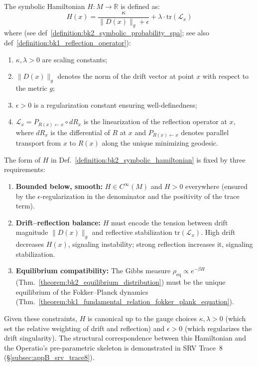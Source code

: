 \begin{definition} 
\label{definition:bk2_symbolic_hamiltonian} 
The symbolic Hamiltonian $H: M \rightarrow \mathbb{R}$ is defined as:
\[
H(x) = \frac{\kappa}{\|D(x)\|_g + \epsilon} + \lambda \cdot \text{tr}(\mathcal{L}_x)
\]
where (see def~\ref{definition:bk2_symbolic_probability_spa}; see also def~\ref{definition:bk1_reflection_operator}):
\begin{enumerate}
    \item $\kappa, \lambda > 0$ are scaling constants;
    \item $\|D(x)\|_g$ denotes the norm of the drift vector at point $x$ with respect to the metric $g$;
    \item $\epsilon > 0$ is a regularization constant ensuring well-definedness;
    \item $\mathcal{L}_x = P_{R(x) \leftarrow x} \circ dR_x$ is the linearization of the reflection operator at $x$, where $dR_x$ is the differential of $R$ at $x$ and $P_{R(x) \leftarrow x}$ denotes parallel transport from $x$ to $R(x)$ along the unique minimizing geodesic.
\end{enumerate}
\end{definition}

\begin{remark}
\label{remark:bk2_symbolic_hamiltonian}
The form of $H$ in Def.~\ref{definition:bk2_symbolic_hamiltonian} is fixed by three requirements:
\begin{enumerate}
    \item \textbf{Bounded below, smooth:} $H \in C^\infty(M)$ and $H > 0$ everywhere (ensured by the $\epsilon$-regularization in the denominator and the positivity of the trace term).
    \item \textbf{Drift--reflection balance:} $H$ must encode the tension between drift magnitude $\|D(x)\|_g$ and reflective stabilization $\mathrm{tr}(\mathcal{L}_x)$. High drift decreases $H(x)$, signaling instability; strong reflection increases it, signaling stabilization.
    \item \textbf{Equilibrium compatibility:} The Gibbs measure $\rho_{\mathrm{eq}} \propto e^{-\beta H}$ (Thm.~\ref{theorem:bk2_equilibrium_distribution}) must be the unique equilibrium of the Fokker--Planck dynamics (Thm.~\ref{theorem:bk1_fundamental_relation_fokker_plank_equation}).
\end{enumerate}
Given these constraints, $H$ is canonical up to the gauge choices $\kappa, \lambda > 0$ (which set the relative weighting of drift and reflection) and $\epsilon > 0$ (which regularizes the drift singularity). The structural correspondence between this Hamiltonian and the Operatio's pre-parametric skeleton is demonstrated in SRV Trace~8 (\S\ref{subsec:appB_srv_trace8}).
\end{remark}

